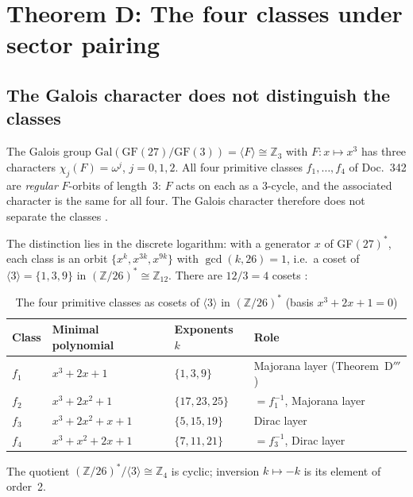 \section{Theorem D: The four classes under sector pairing}

\subsection{The Galois character does not distinguish the classes}

The Galois group $\mathrm{Gal}(\mathrm{GF}(27)/\mathrm{GF}(3)) = \langle F\rangle \cong \mathbb{Z}_3$
with $F\colon x \mapsto x^3$ has three characters $\chi_j(F) = \omega^j$, $j=0,1,2$.
All four primitive classes $f_1,\ldots,f_4$ of Doc.~342 are \emph{regular} $F$-orbits
of length~3: $F$ acts on each as a 3-cycle, and the associated character is the same
for all four. The Galois character therefore does not separate the classes \BM.

The distinction lies in the discrete logarithm: with a generator $x$ of GF$(27)^*$,
each class is an orbit $\{x^k, x^{3k}, x^{9k}\}$ with $\gcd(k,26)=1$, i.e.\ a coset
of $\langle 3\rangle = \{1,3,9\}$ in $(\mathbb{Z}/26)^* \cong \mathbb{Z}_{12}$.
There are $12/3 = 4$ cosets \BM:

\begin{table}[H]
\centering
\caption{The four primitive classes as cosets of $\langle 3\rangle$ in $(\mathbb{Z}/26)^*$
  (basis $x^3 + 2x + 1 = 0$)}
\begin{tabular}{llll}
\toprule
Class & Minimal polynomial & Exponents $k$ & Role \\
\midrule
$f_1$ & $x^3 + 2x + 1$ & $\{1, 3, 9\}$ & Majorana layer (Theorem~D$'''$) \\
$f_2$ & $x^3 + 2x^2 + 1$ & $\{17, 23, 25\}$ & $= f_1^{-1}$, Majorana layer \\
$f_3$ & $x^3 + 2x^2 + x + 1$ & $\{5, 15, 19\}$ & Dirac layer \\
$f_4$ & $x^3 + x^2 + 2x + 1$ & $\{7, 11, 21\}$ & $= f_3^{-1}$, Dirac layer \\
\bottomrule
\end{tabular}
\end{table}

The quotient $(\mathbb{Z}/26)^*/\langle 3\rangle \cong \mathbb{Z}_4$ is cyclic;
inversion $k \mapsto -k$ is its element of order~2.

